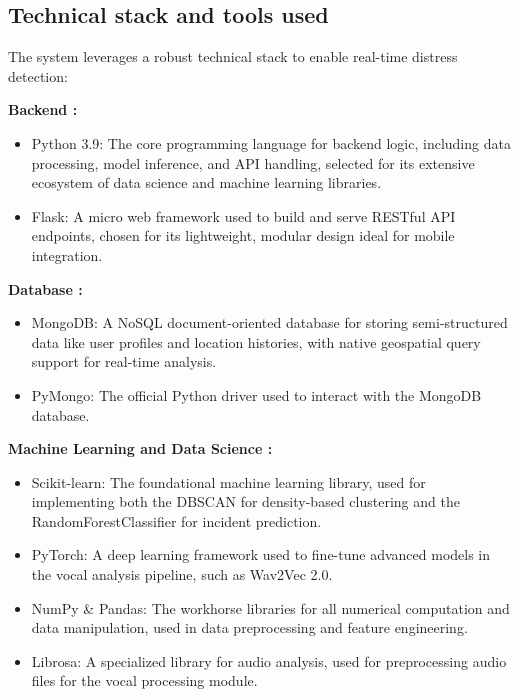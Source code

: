 \documentclass[12pt,a4paper,oneside,english]{book}
\begin{document}
{\subsection{Technical stack and tools used}
\label{technical}
The system leverages a robust technical stack to enable real-time distress detection:

\textbf{Backend :}
\begin{itemize}
    \item Python 3.9: The core programming language for backend logic, including data processing, model inference, and API handling, selected for its extensive ecosystem of data science and machine learning libraries.
    \item Flask: A micro web framework used to build and serve RESTful API endpoints, chosen for its lightweight, modular design ideal for mobile integration.
\end{itemize}

\textbf{Database :}
\begin{itemize}
\item MongoDB: A NoSQL document-oriented database for storing semi-structured data like user profiles and location histories, with native geospatial query support for real-time analysis.
\item PyMongo: The official Python driver used to interact with the MongoDB database.
\end{itemize}

\textbf{Machine Learning and Data Science :}

\begin{itemize}

\item Scikit-learn: The foundational machine learning library, used for implementing both the DBSCAN for density-based clustering and the RandomForestClassifier for incident prediction.
\item PyTorch: A deep learning framework used to fine-tune advanced models in the vocal analysis pipeline, such as Wav2Vec 2.0.
\item NumPy \& Pandas: The workhorse libraries for all numerical computation and data manipulation, used in data preprocessing and feature engineering.
\item Librosa: A specialized library for audio analysis, used for preprocessing audio files for the vocal processing module.
\end{itemize}

}
\end{document}
